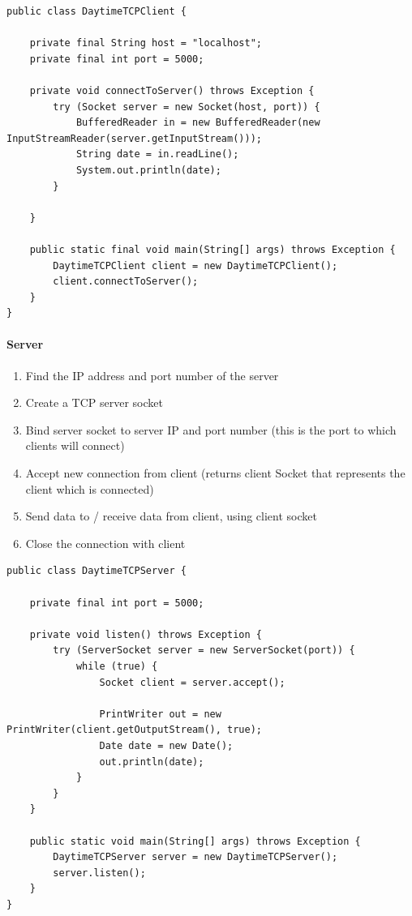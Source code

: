 \begin{lstlisting}
public class DaytimeTCPClient {
	
	private final String host = "localhost";
	private final int port = 5000;
	
	private void connectToServer() throws Exception {
		try (Socket server = new Socket(host, port)) {
			BufferedReader in = new BufferedReader(new InputStreamReader(server.getInputStream()));
			String date = in.readLine();
			System.out.println(date);
		}
		
	}
	
	public static final void main(String[] args) throws Exception {
		DaytimeTCPClient client = new DaytimeTCPClient();
		client.connectToServer();
	}
}
\end{lstlisting}

\paragraph{Server}
\begin{enumerate}
	\item Find the IP address and port number of the server
	\item Create a TCP server socket
	\item Bind server socket to server IP and port number (this is the port to which clients will 
	connect)
	\item Accept new connection from client (returns client Socket that represents the client 
	which is connected)
	\item Send data to / receive data from client, using client socket
	\item Close the connection with client  
\end{enumerate}

\begin{lstlisting}
public class DaytimeTCPServer {
	
	private final int port = 5000;
	
	private void listen() throws Exception {
		try (ServerSocket server = new ServerSocket(port)) {
			while (true) {
				Socket client = server.accept();
				
				PrintWriter out = new PrintWriter(client.getOutputStream(), true);
				Date date = new Date();
				out.println(date);
			}
		}
	}
	
	public static void main(String[] args) throws Exception {
		DaytimeTCPServer server = new DaytimeTCPServer();
		server.listen();
	}
}
\end{lstlisting}

